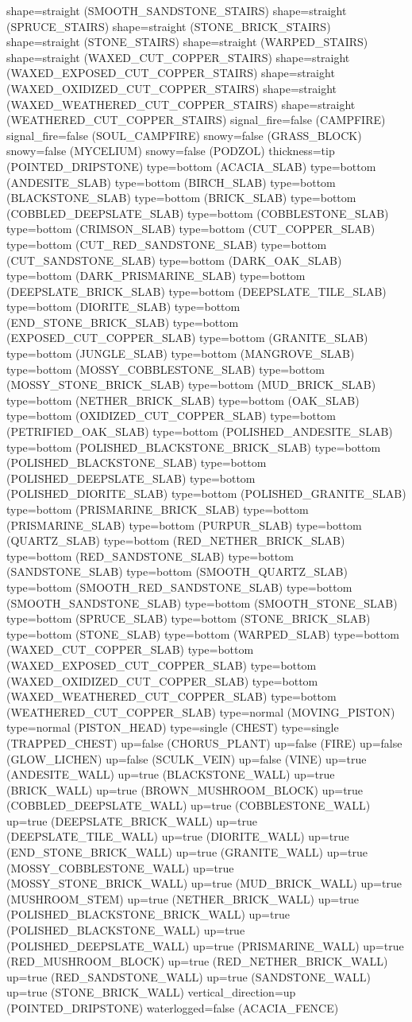 \documentclass[11pt]{article}
\begin{document}
shape=straight (SMOOTH_SANDSTONE_STAIRS)
shape=straight (SPRUCE_STAIRS)
shape=straight (STONE_BRICK_STAIRS)
shape=straight (STONE_STAIRS)
shape=straight (WARPED_STAIRS)
shape=straight (WAXED_CUT_COPPER_STAIRS)
shape=straight (WAXED_EXPOSED_CUT_COPPER_STAIRS)
shape=straight (WAXED_OXIDIZED_CUT_COPPER_STAIRS)
shape=straight (WAXED_WEATHERED_CUT_COPPER_STAIRS)
shape=straight (WEATHERED_CUT_COPPER_STAIRS)
signal_fire=false (CAMPFIRE)
signal_fire=false (SOUL_CAMPFIRE)
snowy=false (GRASS_BLOCK)
snowy=false (MYCELIUM)
snowy=false (PODZOL)
thickness=tip (POINTED_DRIPSTONE)
type=bottom (ACACIA_SLAB)
type=bottom (ANDESITE_SLAB)
type=bottom (BIRCH_SLAB)
type=bottom (BLACKSTONE_SLAB)
type=bottom (BRICK_SLAB)
type=bottom (COBBLED_DEEPSLATE_SLAB)
type=bottom (COBBLESTONE_SLAB)
type=bottom (CRIMSON_SLAB)
type=bottom (CUT_COPPER_SLAB)
type=bottom (CUT_RED_SANDSTONE_SLAB)
type=bottom (CUT_SANDSTONE_SLAB)
type=bottom (DARK_OAK_SLAB)
type=bottom (DARK_PRISMARINE_SLAB)
type=bottom (DEEPSLATE_BRICK_SLAB)
type=bottom (DEEPSLATE_TILE_SLAB)
type=bottom (DIORITE_SLAB)
type=bottom (END_STONE_BRICK_SLAB)
type=bottom (EXPOSED_CUT_COPPER_SLAB)
type=bottom (GRANITE_SLAB)
type=bottom (JUNGLE_SLAB)
type=bottom (MANGROVE_SLAB)
type=bottom (MOSSY_COBBLESTONE_SLAB)
type=bottom (MOSSY_STONE_BRICK_SLAB)
type=bottom (MUD_BRICK_SLAB)
type=bottom (NETHER_BRICK_SLAB)
type=bottom (OAK_SLAB)
type=bottom (OXIDIZED_CUT_COPPER_SLAB)
type=bottom (PETRIFIED_OAK_SLAB)
type=bottom (POLISHED_ANDESITE_SLAB)
type=bottom (POLISHED_BLACKSTONE_BRICK_SLAB)
type=bottom (POLISHED_BLACKSTONE_SLAB)
type=bottom (POLISHED_DEEPSLATE_SLAB)
type=bottom (POLISHED_DIORITE_SLAB)
type=bottom (POLISHED_GRANITE_SLAB)
type=bottom (PRISMARINE_BRICK_SLAB)
type=bottom (PRISMARINE_SLAB)
type=bottom (PURPUR_SLAB)
type=bottom (QUARTZ_SLAB)
type=bottom (RED_NETHER_BRICK_SLAB)
type=bottom (RED_SANDSTONE_SLAB)
type=bottom (SANDSTONE_SLAB)
type=bottom (SMOOTH_QUARTZ_SLAB)
type=bottom (SMOOTH_RED_SANDSTONE_SLAB)
type=bottom (SMOOTH_SANDSTONE_SLAB)
type=bottom (SMOOTH_STONE_SLAB)
type=bottom (SPRUCE_SLAB)
type=bottom (STONE_BRICK_SLAB)
type=bottom (STONE_SLAB)
type=bottom (WARPED_SLAB)
type=bottom (WAXED_CUT_COPPER_SLAB)
type=bottom (WAXED_EXPOSED_CUT_COPPER_SLAB)
type=bottom (WAXED_OXIDIZED_CUT_COPPER_SLAB)
type=bottom (WAXED_WEATHERED_CUT_COPPER_SLAB)
type=bottom (WEATHERED_CUT_COPPER_SLAB)
type=normal (MOVING_PISTON)
type=normal (PISTON_HEAD)
type=single (CHEST)
type=single (TRAPPED_CHEST)
up=false (CHORUS_PLANT)
up=false (FIRE)
up=false (GLOW_LICHEN)
up=false (SCULK_VEIN)
up=false (VINE)
up=true (ANDESITE_WALL)
up=true (BLACKSTONE_WALL)
up=true (BRICK_WALL)
up=true (BROWN_MUSHROOM_BLOCK)
up=true (COBBLED_DEEPSLATE_WALL)
up=true (COBBLESTONE_WALL)
up=true (DEEPSLATE_BRICK_WALL)
up=true (DEEPSLATE_TILE_WALL)
up=true (DIORITE_WALL)
up=true (END_STONE_BRICK_WALL)
up=true (GRANITE_WALL)
up=true (MOSSY_COBBLESTONE_WALL)
up=true (MOSSY_STONE_BRICK_WALL)
up=true (MUD_BRICK_WALL)
up=true (MUSHROOM_STEM)
up=true (NETHER_BRICK_WALL)
up=true (POLISHED_BLACKSTONE_BRICK_WALL)
up=true (POLISHED_BLACKSTONE_WALL)
up=true (POLISHED_DEEPSLATE_WALL)
up=true (PRISMARINE_WALL)
up=true (RED_MUSHROOM_BLOCK)
up=true (RED_NETHER_BRICK_WALL)
up=true (RED_SANDSTONE_WALL)
up=true (SANDSTONE_WALL)
up=true (STONE_BRICK_WALL)
vertical_direction=up (POINTED_DRIPSTONE)
waterlogged=false (ACACIA_FENCE)
\end{document}
